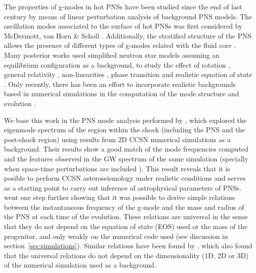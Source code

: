  
 The {properties of} g-modes in hot {PNSs} have been studied since the end of last century {by means of linear perturbation analysis of background PNS models}. The oscillation modes {associated to} the surface of hot PNSs was first considered by McDermott, van Horn \& Scholl \cite{McDermott:1983}. Additionally, the stratified structure of the PNS allows the presence of different types of g-modes related with the fluid core \cite{Reisenegger:1992}. Many posterior works used simplified neutron star models assuming an equilibrium configuration {as a background}, to study the effect of rotation \cite{Ferrari:2004}, general relativity \cite{Passamonti:2005}, non-linearities \cite{Dimmelmeier:2006}, phase transition \cite{Kruger:2015} and realistic equation of state \cite{Camelio:2017}. {Only recently, there has been an effort to incorporate realistic backgrounds based in numerical simulations in the computation of the mode structure and evolution \cite{Sotani:2016,Torres:2018, Morozova:2018, Torres:2019a,Torres:2019b,Sotani:2019,WS:2019,Sotani:2020a, Sotani:2020b}}.
 
 {We base this work in the PNS mode analysis performed by \cite{Torres:2018, Torres:2019a}, which explored the eigenmode spectrum of the region within the shock (including the PNS and the post-shock region) 
 using results from 2D CCSN numerical simulations as a background. Their results show a good match of the mode frequencies computed and the features observed in the GW spectrum of the same simulation (specially
 when space-time perturbations are included \citep{Torres:2019a}).  This result} reveals that it is posible to perform CCSN asteroseismology {under realistic conditions} and serves as a starting point to carry out inference of astrophysical parameters of PNSs.  {\cite{Torres:2019b} went one step further showing that it was possible to derive simple relations} between the { instantaneous frequency of the g-mode and} the mass and radius of the PNS {at each time of the evolution}. These relations are universal in the sense that they do not depend {on the equation of state (EOS) used} or the mass of the progenitor, {and only weakly on} the numerical code used {(see discussion in section~\ref{sec:simulations})}. {Similar relations have been found by \cite{Sotani:2020a,Sotani:2020b}, which also found that the universal relations do not depend on the dimensionality (1D, 2D or 3D) of the numerical simulation used as a background.}
 
